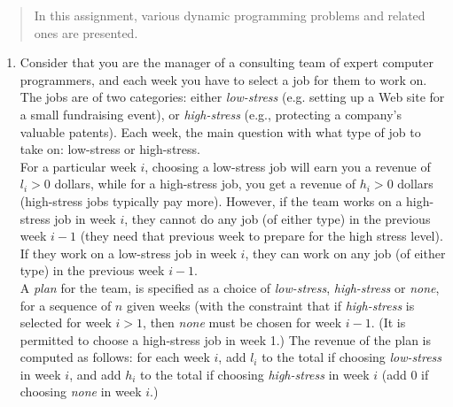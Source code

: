\documentclass[11pts]{article}
\begin{document}
\maketitle

\begin{abstract}
In this assignment, various dynamic programming problems and related ones are
presented.
\end{abstract}
\newpage

\begin{enumerate}
\item Consider that you are the manager of a consulting team of
      expert computer programmers, and each week you have to select a
      job for them to work on. The jobs are of two categories: either
      \textit{low-stress} (e.g. setting up a Web site for a small fundraising
      event), or \textit{high-stress} (e.g., protecting a company’s valuable
      patents). Each week, the main question with what type of job to
      take on: low-stress or high-stress. \\

      For a particular week $i$,
      choosing a low-stress job will earn you a revenue of $l_i > 0$
      dollars, while for a high-stress job, you get a revenue of $h_i > 0$
      dollars (high-stress jobs typically pay more). However, if the team
      works on a high-stress job in week $i$, they cannot do any job (of
      either type) in the previous week $i-1$ (they need that previous week
      to prepare for the high stress level). If they work on a low-stress
      job in week $i$, they can work on any job (of either type) in the
      previous week $i-1$. \\

      A \textit{plan} for the team, is specified as a choice of
      \textit{low-stress}, \textit{high-stress} or \textit{none}, for a
      sequence of $n$ given weeks
      (with the constraint that if \textit{high-stress} is selected for week
      $i > 1$, then \textit{none} must be chosen for week $i-1$.
      (It is permitted to
      choose a high-stress job in week 1.) The revenue of the plan is
      computed as follows: for each week $i$, add $l_i$ to the total if
      choosing \textit{low-stress} in week $i$, and add $h_i$ to
      the total if choosing
      \textit{high-stress} in week $i$ (add $0$ if choosing \textit{none}
      in week $i$.) \\


\end{enumerate}
\end{document}
